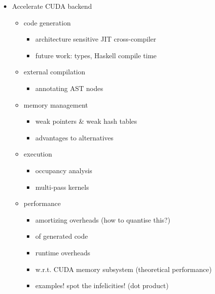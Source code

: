 \begin{itemize}
    \item Accelerate CUDA backend
        \begin{itemize}
            \item code generation
                \begin{itemize}
                    \item architecture sensitive JIT cross-compiler
                    \item future work: types, Haskell compile time
                \end{itemize}
            \item external compilation
                \begin{itemize}
                    \item annotating AST nodes
                \end{itemize}
            \item memory management
                \begin{itemize}
                    \item weak pointers \& weak hash tables
                    \item advantages to alternatives
                \end{itemize}
            \item execution
                \begin{itemize}
                    \item occupancy analysis
                    \item multi-pass kernels
                \end{itemize}
            \item performance
                \begin{itemize}
                    \item amortizing overheads (how to quantise this?)
                    \item of generated code
                    \item runtime overheads
                    \item w.r.t. CUDA memory subsystem (theoretical performance)
                    \item examples! spot the infelicities! (dot product)
                \end{itemize}
        \end{itemize}

\end{itemize}


